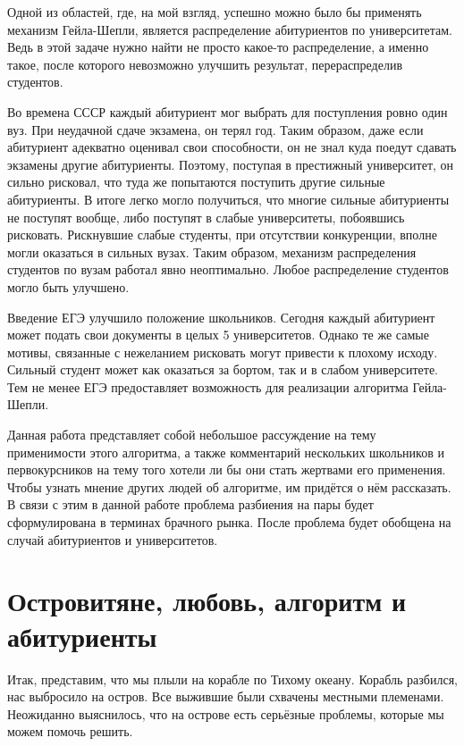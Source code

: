 \documentclass[pdftex, 12pt, a4paper]{article}
\begin{document}
Одной из областей, где, на мой взгляд, успешно можно было бы применять механизм Гейла-Шепли, является распределение абитуриентов по университетам. Ведь в этой задаче нужно найти не просто какое-то распределение,  а именно такое, после которого невозможно улучшить результат, перераспределив студентов. 

Во времена СССР каждый абитуриент мог выбрать для поступления ровно один вуз. При неудачной сдаче экзамена, он терял год. Таким образом, даже если абитуриент адекватно оценивал свои способности, он не знал куда поедут сдавать экзамены другие абитуриенты. Поэтому, поступая в престижный университет, он сильно рисковал, что туда же попытаются поступить другие сильные абитуриенты. В итоге легко могло получиться, что многие сильные абитуриенты не поступят вообще, либо поступят в слабые университеты, побоявшись рисковать. Рискнувшие слабые студенты, при отсутствии конкуренции, вполне могли оказаться в сильных вузах. Таким образом, механизм распределения студентов по вузам работал явно неоптимально. Любое распределение студентов могло быть улучшено.  

Введение ЕГЭ улучшило положение школьников. Сегодня каждый абитуриент может подать свои документы в целых 5 университетов. Однако те же самые мотивы, связанные с нежеланием рисковать могут привести к плохому исходу. Сильный студент может как оказаться за бортом, так и в слабом университете. Тем не менее ЕГЭ предоставляет возможность для реализации алгоритма Гейла-Шепли. 

Данная работа представляет собой небольшое рассуждение на тему применимости этого алгоритма, а также комментарий нескольких школьников и первокурсников на тему того хотели ли бы они стать жертвами его применения. Чтобы узнать мнение других людей об алгоритме, им придётся о нём рассказать. В связи с этим в данной работе проблема разбиения на пары будет сформулирована в терминах брачного рынка. После проблема будет обобщена на случай абитуриентов и университетов.  

\section{Островитяне, любовь, алгоритм и абитуриенты} 

Итак, представим, что мы плыли на корабле по Тихому океану. Корабль разбился, нас выбросило на остров. Все выжившие были схвачены местными племенами. Неожиданно выяснилось, что на острове есть серьёзные проблемы, которые мы можем помочь решить.  
\end{document}
